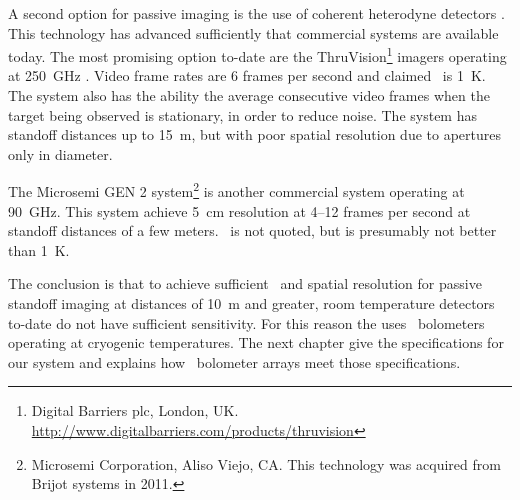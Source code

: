 A second option for passive imaging is the use of coherent heterodyne detectors \cite{rieke_detection_2003,rogalski_terahertz_2011}.
This technology has advanced sufficiently that commercial systems are available today.
The most promising option to-date are the ThruVision\footnote{Digital Barriers plc, London, UK. \url{http://www.digitalbarriers.com/products/thruvision}} imagers operating at \SI{250}{\GHz} \cite{mann_first_2009,digital_barriers_extra_????}.
Video frame rates are 6 frames per second and claimed \NETD\ is \SI{1}{\K}.
The system also has the ability the average consecutive video frames when the target being observed is stationary, in order to reduce noise.
The system has standoff distances up to \SI{15}{\m}, but with poor spatial resolution due to apertures only  in diameter.

The Microsemi GEN 2 system\footnote{%
Microsemi Corporation, Aliso Viejo, CA. This technology was acquired from Brijot systems in 2011.}
is another commercial system operating at \SI{90}{\GHz}.
This system achieve \SI{5}{\cm} resolution at 4--12 frames per second at standoff distances of a few meters.
\NETD\ is not quoted, but is presumably not better than \SI{1}{\K}.

The conclusion is that to achieve sufficient \NETD\ and spatial resolution for passive standoff imaging at distances of \SI{10}{\m} and greater, room temperature detectors to-date do not have sufficient sensitivity.
For this reason the \Imager uses \TES\ bolometers operating at cryogenic temperatures.
The next chapter give the specifications for our system and explains how \TES\ bolometer arrays meet those specifications.
